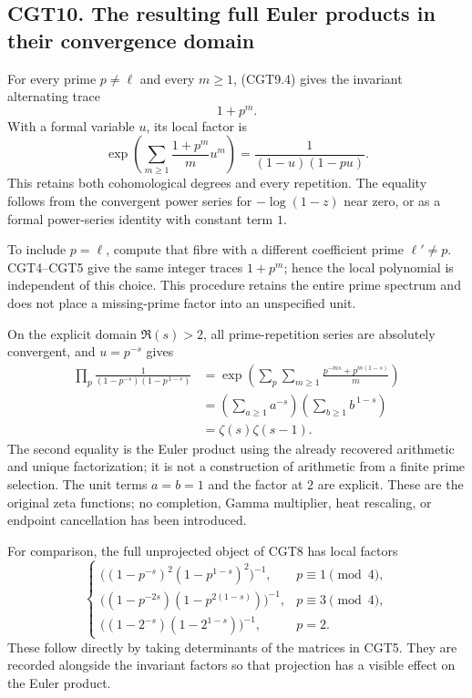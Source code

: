 \subsection{CGT10. The resulting full Euler products in their
convergence
domain}\label{cgt10.-the-resulting-full-euler-products-in-their-convergence-domain}

For every prime \(p\ne\ell\) and every \(m\ge1\), (CGT9.4) gives the
invariant alternating trace \[
1+p^m.
\tag{CGT10.1}
\] With a formal variable \(u\), its local factor is \[
\exp\left(\sum_{m\ge1}\frac{1+p^m}{m}u^m\right)
=\frac1{(1-u)(1-pu)}.
\tag{CGT10.2}
\] This retains both cohomological degrees and every repetition. The
equality follows from the convergent power series for \(-\log(1-z)\)
near zero, or as a formal power-series identity with constant term
\(1\).

To include \(p=\ell\), compute that fibre with a different coefficient
prime \(\ell'\ne p\). CGT4--CGT5 give the same integer traces \(1+p^m\);
hence the local polynomial is independent of this choice. This procedure
retains the entire prime spectrum and does not place a missing-prime
factor into an unspecified unit.

On the explicit domain \(\Re(s)>2\), all prime-repetition series are
absolutely convergent, and \(u=p^{-s}\) gives \[
\begin{aligned}
\prod_p\frac1{(1-p^{-s})(1-p^{\,1-s})}
&=\exp\left(\sum_p\sum_{m\ge1}
\frac{p^{-ms}+p^{m(1-s)}}m\right)\\
&=\left(\sum_{a\ge1}a^{-s}\right)
\left(\sum_{b\ge1}b^{\,1-s}\right)\\
&=\boxed{\zeta(s)\zeta(s-1)}.
\end{aligned}
\tag{CGT10.3}
\] The second equality is the Euler product using the already recovered
arithmetic and unique factorization; it is not a construction of
arithmetic from a finite prime selection. The unit terms \(a=b=1\) and
the factor at \(2\) are explicit. These are the original zeta functions;
no completion, Gamma multiplier, heat rescaling, or endpoint
cancellation has been introduced.

For comparison, the full unprojected object of CGT8 has local factors \[
\begin{cases}
\bigl((1-p^{-s})^2(1-p^{1-s})^2\bigr)^{-1},&p\equiv1\pmod4,\\
\bigl((1-p^{-2s})(1-p^{2(1-s)})\bigr)^{-1},&p\equiv3\pmod4,\\
\bigl((1-2^{-s})(1-2^{1-s})\bigr)^{-1},&p=2.
\end{cases}
\tag{CGT10.4}
\] These follow directly by taking determinants of the matrices in CGT5.
They are recorded alongside the invariant factors so that projection has
a visible effect on the Euler product.

